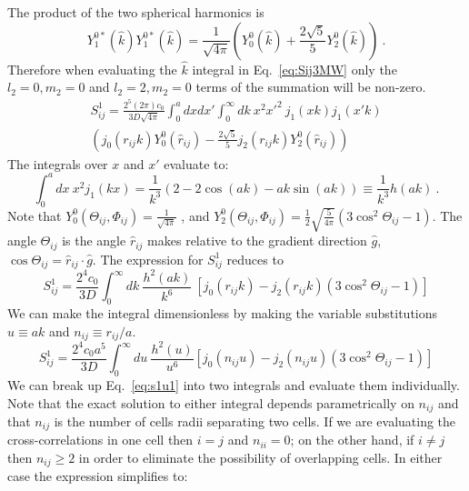 The product of the two spherical harmonics is
\begin{equation*}
    Y_{1}^{0*}(\hat{k}) Y_{1}^{0*}(\hat{k}) = \frac{1}{\sqrt{4\pi}} \left( Y_0^0(\hat{k}) + \frac{2\sqrt{5}}{5} Y_2^0(\hat{k}) \right) \ .
\end{equation*}
Therefore when evaluating the $\hat{k}$ integral in Eq.\ \ref{eq:Sij3MW} only the $l_2=0,m_2=0$ and $l_2=2,m_2=0$ terms of the summation will be non-zero.
\begin{equation}
\begin{split}
    S_{ij}^1 = \frac{2^5(2\pi)c_0}{3D\sqrt{4\pi}} \int_0^a dx dx' \int_0^\infty dk \ x^2 x'^2 \ j_{1}(xk) j_{1}(x'k) \\ \left(j_0(r_{ij}k) Y_0^0(\hat{r}_{ij}) - \frac{2\sqrt{5}}{5} j_2(r_{ij}k) Y_2^0(\hat{r}_{ij}) \right)
\end{split}
\end{equation}
The integrals over $x$ and $x'$ evaluate to:
\begin{equation*}
    \int_0^a dx \ x^2 j_1(kx) = \frac{1}{k^3}\left(2-2\cos(ak)-ak\sin(ak) \right) \equiv \frac{1}{k^3} h(ak) \ .
\end{equation*}
Note that
$Y_0^0(\Theta_{ij},\Phi_{ij}) = \frac{1}{\sqrt{4\pi}}$
, and
$Y_2^0(\Theta_{ij},\Phi_{ij}) = \frac{1}{2} \sqrt{\frac{5}{4\pi}} (3\cos^2\Theta_{ij}-1)$.
The angle $\Theta_{ij}$ is the angle $\hat{r}_{ij}$ makes relative to the gradient direction $\hat{g}$, $\cos\Theta_{ij} = \hat{r}_{ij}\cdot\hat{g}$. The expression for $S_{ij}^1$ reduces to
\begin{equation}
    S_{ij}^1 = \frac{2^4c_0}{3D} \int_0^\infty dk \ \frac{h^2(ak)}{k^6} \ \left[j_0(r_{ij}k) - j_2(r_{ij}k) (3\cos^2\Theta_{ij}-1) \right]
\end{equation}
We can make the integral dimensionless by making the variable substitutions $u \equiv ak$ and $n_{ij} \equiv r_{ij}/a$.
\begin{equation}
    S_{ij}^1 = \frac{2^4c_0a^5}{3D} \int_0^\infty du \ \frac{h^2(u)}{u^6} \left[j_0\left(n_{ij}u\right) - j_2\left(n_{ij}u\right) (3\cos^2\Theta_{ij}-1) \right] \label{eq:s1u1}
\end{equation}
We can break up Eq.\ \ref{eq:s1u1} into two integrals and evaluate them individually. Note that the exact solution to either integral depends parametrically on $n_{ij}$ and that $n_{ij}$ is the number of cells radii separating two cells. If we are evaluating the cross-correlations in one cell then $i=j$ and $n_{ii}=0$; on the other hand, if $i\neq j$ then $n_{ij} \geq 2$ in order to eliminate the possibility of overlapping cells. In either case the expression simplifies to:
